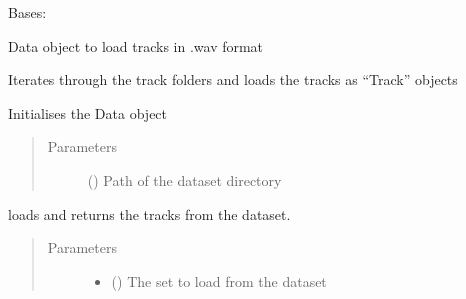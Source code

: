 \documentclass[letterpaper,10pt,english]{sphinxmanual}
\begin{document}
\begin{fulllineitems}
\label{\detokenize{docs/source/preprocess:preprocess.data.Data}}
Bases: 

Data object to load tracks in .wav format

\begin{fulllineitems}
\label{\detokenize{docs/source/preprocess:preprocess.data.Data.get_tracks}}
Iterates through the track folders and loads the tracks as “Track” objects

\end{fulllineitems}


\begin{fulllineitems}
\label{\detokenize{docs/source/preprocess:preprocess.data.Data.__init__}}
Initialises the Data object
\begin{quote}\begin{description}
\item[{Parameters}] \leavevmode
{} () \textendash{} Path of the dataset directory

\end{description}\end{quote}

\end{fulllineitems}


\begin{fulllineitems}
loads and returns the tracks from the dataset.
\begin{quote}\begin{description}
\item[{Parameters}] \leavevmode\begin{itemize}
\item {} 
 () \textendash{} The set to load from the dataset


\end{itemize}
\end{description}
\end{quote}
\end{fulllineitems}
\end{fulllineitems}
\end{document}
